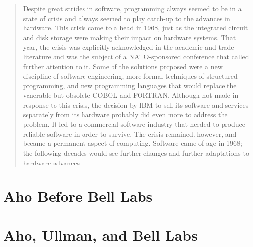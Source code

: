 \begin{quotation}
Despite great strides in software, programming always seemed to be in a state 
of crisis and always seemed to play catch-up to the advances in hardware. This 
crisis came to a head in 1968, just as the integrated circuit and disk storage 
were making their impact on hardware systems. That year, the crisis was 
explicitly acknowledged in the academic and trade literature and was the 
subject of a NATO-sponsored conference that called further attention to it. 
Some of the solutions proposed were a new discipline of software engineering, 
more formal techniques of structured programming, and new programming languages 
that would replace the venerable but obsolete COBOL and FORTRAN. Although not 
made in response to this crisis, the decision by IBM to sell its software and 
services separately from its hardware probably did even more to address the 
problem. It led to a commercial software industry that needed to produce 
reliable software in order to survive. The crisis remained, however, and became 
a permanent aspect of computing. Software came of age in 1968; the following 
decades would see further changes and further adaptations to hardware advances.
\end{quotation}


\section{Aho Before Bell Labs}

\section{Aho, Ullman, and Bell Labs}


